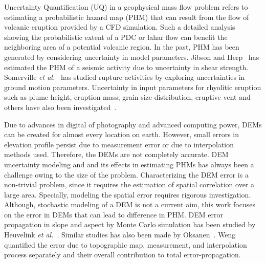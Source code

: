 Uncertainty Quantification (UQ) in a geophysical mass flow problem refers to estimating a probabilistic hazard map (PHM) that can result from the flow of volcanic eruption provided by a CFD simulation. Such a detailed analysis showing the probabilistic extent of a PDC or lahar flow can benefit the neighboring area of a potential volcanic region. In the past, PHM has been generated by considering uncertainty in model parameters. Jibson and Herp~\cite{jibson2000method} has estimated the PHM of a seismic activity due to uncertainty in shear strength. Somerville \textit{et al.}~\cite{somerville1997modification} has studied rupture activities by exploring uncertainties in ground motion parameters. Uncertainty in input parameters for rhyolitic eruption such as plume height, eruption mass, grain size distribution, eruptive vent and others have also been investigated~\cite{bonadonna2005probabilistic}. 


Due to advances in digital of photography and advanced computing power, DEMs can be created for almost every location on earth. %
However, small errors in elevation profile persist due to measurement error or due to interpolation methods used. Therefore, the DEMs are not completely accurate. 
DEM uncertainty modeling and and its effects in estimating PHMs has always been a challenge owing to the size of the problem. Characterizing the DEM error is a non-trivial problem, since it requires the estimation of spatial correlation over a large area. Specially, modeling the spatial error requires rigorous investigation. Although, stochastic modeling of a DEM is not a current aim, this work focuses on the error in DEMs that can lead to difference in PHM. DEM error propagation in slope and aspect by Monte Carlo simulation has been studied by Heuvelink \textit{et al.}~\cite{heuvelink1998error}. Similar studies has also been made by Oksanen~\cite{oksanen2005error,oksanen2006digital}. Weng~\cite{weng2002quantifying} quantified the error due to topographic map, measurement, and interpolation process separately and their overall contribution to total error-propagation. 




